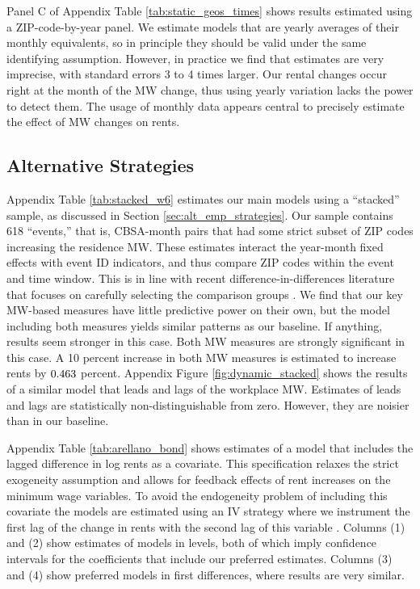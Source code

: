 Panel C of Appendix Table \ref{tab:static_geos_times} shows results estimated 
using a ZIP-code-by-year panel.
We estimate models that are yearly averages of their monthly equivalents, 
so in principle they should be valid under the same identifying assumption.
However, in practice we find that estimates are very imprecise, with standard
errors 3 to 4 times larger.
Our rental changes occur right at the month of the MW change, thus using 
yearly variation lacks the power to detect them.
The usage of monthly data appears central to precisely estimate the 
effect of MW changes on rents.

\subsection{Alternative Strategies}
\label{sec:results_alternative_strategies}

Appendix Table \ref{tab:stacked_w6} estimates our main models using a 
``stacked'' sample, as discussed in Section \ref{sec:alt_emp_strategies}.
Our sample contains 618 ``events,'' that is, CBSA-month pairs that had some 
strict subset of ZIP codes increasing the residence MW.
These estimates interact the year-month fixed effects with event ID indicators, 
and thus compare ZIP codes within the event and time window.
This is in line with recent difference-in-differences literature that 
focuses on carefully selecting the comparison groups 
\parencite{CallawayEtAl2021, deChaisemartinEtAl2022, RothEtAl2022}.
We find that our key MW-based measures have little predictive power on their own,
but the model including both measures yields similar patterns as our baseline.
If anything, results seem stronger in this case.
Both MW measures are strongly significant in this case.
A 10 percent increase in both MW measures is estimated to increase rents 
by $\textnormal{0.463}$ percent.
Appendix Figure \ref{fig:dynamic_stacked} shows the results of a similar model 
that leads and lags of the workplace MW.
Estimates of leads and lags are statistically non-distinguishable from zero.
However, they are noisier than in our baseline.

Appendix Table \ref{tab:arellano_bond} shows estimates of a model that includes
the lagged difference in log rents as a covariate.
This specification relaxes the strict exogeneity assumption and allows for 
feedback effects of rent increases on the minimum wage variables.
To avoid the endogeneity problem of including this covariate the models are 
estimated using an IV strategy where we instrument the first lag of the change 
in rents with the second lag of this variable 
\parencite{ArellanoBond1991,ArellanoHonore2001}.
Columns (1) and (2) show estimates of models in levels, both of which imply
confidence intervals for the coefficients that include our preferred estimates.
Columns (3) and (4) show preferred models in first differences, where results
are very similar. 

